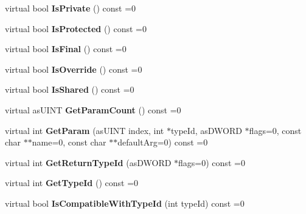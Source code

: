 \begin{DoxyCompactItemize}
virtual bool {\bfseries Is\+Private} () const =0
\item 
\mbox{\label{classas_i_script_function_a2e17b763527ba3a9b0d05c4cd35b5742}} 
virtual bool {\bfseries Is\+Protected} () const =0
\item 
\mbox{\label{classas_i_script_function_aa071c702946372020a1245f901502d52}} 
virtual bool {\bfseries Is\+Final} () const =0
\item 
\mbox{\label{classas_i_script_function_a5aec17ae5639fb9cad403c835d429f6e}} 
virtual bool {\bfseries Is\+Override} () const =0
\item 
\mbox{\label{classas_i_script_function_a805ae8064598ad12f44bb583118b6cc5}} 
virtual bool {\bfseries Is\+Shared} () const =0
\item 
\mbox{\label{classas_i_script_function_a8ca059886317b944c52933b7bbe85cfa}} 
virtual as\+U\+I\+NT {\bfseries Get\+Param\+Count} () const =0
\item 
\mbox{\label{classas_i_script_function_a2b3000b9fc5d3f2cfeea490d8c0c062a}} 
virtual int {\bfseries Get\+Param} (as\+U\+I\+NT index, int $\ast$type\+Id, as\+D\+W\+O\+RD $\ast$flags=0, const char $\ast$$\ast$name=0, const char $\ast$$\ast$default\+Arg=0) const =0
\item 
\mbox{\label{classas_i_script_function_a18968d49065c6af9833ee589b6d1e864}} 
virtual int {\bfseries Get\+Return\+Type\+Id} (as\+D\+W\+O\+RD $\ast$flags=0) const =0
\item 
\mbox{\label{classas_i_script_function_a4a5e24c464e423a2a6724cb849babd21}} 
virtual int {\bfseries Get\+Type\+Id} () const =0
\item 
\mbox{\label{classas_i_script_function_a76715df2843cb37cc010fc3a5d999e84}} 
virtual bool {\bfseries Is\+Compatible\+With\+Type\+Id} (int type\+Id) const =0
\item 
\mbox{\label{classas_i_script_function_ae1786c3f4341dc3bfcaacc3cb8900a57}} 

\end{DoxyCompactItemize}
